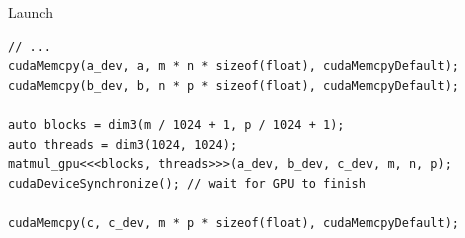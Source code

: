 \begin{frame}[fragile]{Launch}
    \center
    \begin{verbatim}
// ...
cudaMemcpy(a_dev, a, m * n * sizeof(float), cudaMemcpyDefault);
cudaMemcpy(b_dev, b, n * p * sizeof(float), cudaMemcpyDefault);

auto blocks = dim3(m / 1024 + 1, p / 1024 + 1);
auto threads = dim3(1024, 1024);
matmul_gpu<<<blocks, threads>>>(a_dev, b_dev, c_dev, m, n, p);
cudaDeviceSynchronize(); // wait for GPU to finish

cudaMemcpy(c, c_dev, m * p * sizeof(float), cudaMemcpyDefault);
    \end{verbatim}
\end{frame}
